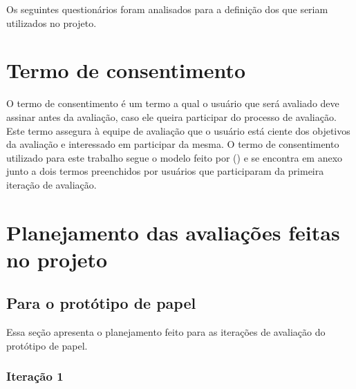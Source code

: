     Os seguintes questionários foram analisados para a definição dos que seriam utilizados no projeto.
    
    
    
    \section{Termo de consentimento}
   
	O termo de consentimento é um termo a qual o usuário que será avaliado deve assinar antes da avaliação, 
	caso ele queira participar do processo de avaliação. Este termo assegura à equipe de avaliação que o usuário
	está ciente dos objetivos da avaliação e interessado em participar da mesma. O termo de consentimento utilizado
	para este trabalho segue o modelo feito por \citeauthor{termoconsentimento} (\citeyear{termoconsentimento}) e
	se encontra em anexo junto a dois termos preenchidos por usuários que participaram
	da primeira iteração de avaliação.
    
    \vfill
    \pagebreak
    \section{Planejamento das avaliações feitas no projeto}
      
      \subsection{Para o protótipo de papel}
      
	Essa seção apresenta o planejamento feito para as iterações de avaliação do protótipo de papel.
      
	\subsubsection{Iteração 1}
	  
